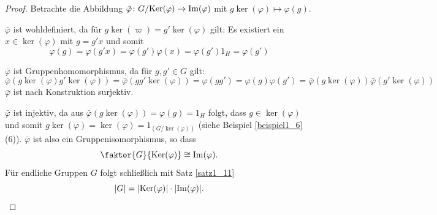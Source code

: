 \begin{proof}
	Betrachte die Abbildung $\bar{\varphi} \colon G/\mathrm{Ker}(\varphi) \to \mathrm{Im}(\varphi)$ mit $g\ker(\varphi) \mapsto \varphi(g)$. 
	
	$\bar{\varphi}$ ist wohldefiniert, da für $g\ker(\varpi) = g'\ker(\varphi)$ gilt: Es existiert ein $x \in \ker(\varphi)$ mit $g = g'x$ und somit 
	\[\varphi(g) = \varphi(g'x) = \varphi(g')\varphi(x) = \varphi(g') 1_H = \varphi(g')\]
	
	$\bar{\varphi}$ ist Gruppenhomomorphismus, da für $g, g' \in G$ gilt:
	\[\bar{\varphi}(g\ker(\varphi) g'\ker(\varphi)) = \bar{\varphi}(gg'\ker(\varphi)) = \varphi(gg') = \varphi(g) \varphi(g') = \bar{\varphi}(g\ker(\varphi)) \bar{\varphi}(g'\ker(\varphi))\]
	$\bar{\varphi}$ ist nach Konstruktion surjektiv.
	
	$\bar{\varphi}$ ist injektiv, da aus $\bar{\varphi}(g\ker(\varphi)) = \varphi(g) = 1_H$ folgt, dass $g \in \ker(\varphi)$ und somit $g\ker(\varphi) = \ker(\varphi) = 1_{(G/\ker(\varphi))}$ (siehe Beispiel \ref{beispiel1_6} (6)). $\bar{\varphi}$ ist also ein Gruppenisomorphismus, so dass
	\[\faktor{G}{\ker(\varphi)} \cong \im (\varphi).\]
	Für endliche Gruppen $G$ folgt schließlich mit Satz \ref{satz1_11}
	\[|G| = |\mathrm{Ker}(\varphi)| \cdot |\mathrm{Im}(\varphi)|.\]
\end{proof}

